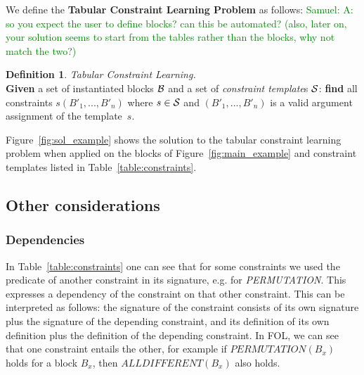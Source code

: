 \documentclass{IEEEtran}
\newcommand{\sergey}[1]{\textcolor{magenta}{{\sc Sergey:} #1}\xspace}
\newcommand{\samuel}[1]{\textcolor{green}{{\sc Samuel:} #1}\xspace}
\newcommand{\constraints}{\ensuremath{\mathcal{T}}\xspace}
\newcommand{\format}[1]{\textit{#1}\xspace}
\newcommand{\template}{\format{constraint template}}
\newcommand{\CSignature}{Signature\xspace}
\newcommand{\CFunction}{Definition\xspace}
\newcommand{\groups}{\ensuremath{\mathcal{B}}\xspace}
\newcommand{\ecalldiff}[1]{\ensuremath{\textit{ALLDIFFERENT}(#1)}}
\newcommand{\ecperm}[1]{\ensuremath{\textit{PERMUTATION}(#1)}}
\newcommand{\sg}{B}
\theoremstyle{definition}
\newtheorem{definition}{Definition}
\begin{document}
We define the {\bf Tabular Constraint Learning Problem} as follows:
%
\samuel{A: so you expect the user to define blocks? can this be automated?
(also, later on, your solution seems to start from the tables rather than the blocks, why not match the two?)}
\begin{definition} \textit{Tabular Constraint Learning.}\label{def:problem_statement}\\
{\bf Given} a set of instantiated blocks ${\cal B}$ and a set of {\template}s ${\cal S}$: {\bf find} all constraints $s(B'_1, ..., B'_n)$ where $s \in {\cal S}$ and $(B'_1, ..., B'_n)$ is a valid argument assignment of the template~$s$.
\end{definition}


Figure~\ref{fig:sol_example} shows the solution to the tabular constraint learning problem when applied on the blocks of Figure~\ref{fig:main_example} and constraint templates listed in Table~\ref{table:constraints}.

\subsection{Other considerations}

\subsubsection{Dependencies}
\label{sec:form:dependencies}
In Table~\ref{table:constraints} one can see that for some constraints we used the predicate of another constraint in its signature, e.g. for \textit{PERMUTATION}. This expresses a dependency of the constraint on that other constraint. This can be interpreted as follows: the signature of the constraint consists of its own signature plus the signature of the depending constraint, and its definition of its own definition plus the definition of the depending constraint.
In FOL, we can see that one constraint entails the other, for example if $\ecperm{\sg_x}$ holds for a block $\sg_x$, then $\ecalldiff{\sg_{x}}$ also holds.
\end{document}
